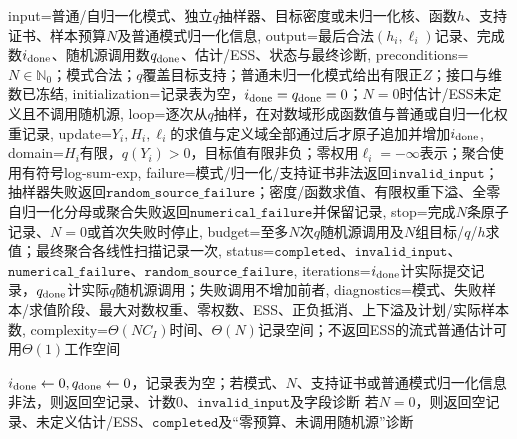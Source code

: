 \begin{AlgorithmContract}{
  input={普通/自归一化模式、独立$q$抽样器、目标密度或未归一化核、函数$h$、支持证书、样本预算$N$及普通模式归一化信息},
  output={最后合法$(h_i,\ell_i)$记录、完成数$i_{\rm done}$、随机源调用数$q_{\rm done}$、估计/ESS、状态与最终诊断},
  preconditions={$N\in\mathbb N_0$；模式合法；$q$覆盖目标支持；普通未归一化模式给出有限正$Z$；接口与维数已冻结},
  initialization={记录表为空，$i_{\rm done}=q_{\rm done}=0$；$N=0$时估计/ESS未定义且不调用随机源},
  loop={逐次从$q$抽样，在对数域形成函数值与普通或自归一化权重记录},
  update={$Y_i,H_i,\ell_i$的求值与定义域全部通过后才原子追加并增加$i_{\rm done}$},
  domain={$H_i$有限，$q(Y_i)>0$，目标值有限非负；零权用$\ell_i=-\infty$表示；聚合使用有符号log-sum-exp},
  failure={模式/归一化/支持证书非法返回$\mathtt{invalid\_input}$；抽样器失败返回$\mathtt{random\_source\_failure}$；密度/函数求值、有限权重下溢、全零自归一化分母或聚合失败返回$\mathtt{numerical\_failure}$并保留记录},
  stop={完成$N$条原子记录、$N=0$或首次失败时停止},
  budget={至多$N$次$q$随机源调用及$N$组目标/$q$/$h$求值；最终聚合各线性扫描记录一次},
  status={$\mathtt{completed}$、$\mathtt{invalid\_input}$、$\mathtt{numerical\_failure}$、$\mathtt{random\_source\_failure}$},
  iterations={$i_{\rm done}$计实际提交记录，$q_{\rm done}$计实际$q$随机源调用；失败调用不增加前者},
  diagnostics={模式、失败样本/求值阶段、最大对数权重、零权数、ESS、正负抵消、上下溢及计划/实际样本数},
  complexity={$\Theta(NC_I)$时间、$\Theta(N)$记录空间；不返回ESS的流式普通估计可用$\Theta(1)$工作空间}
}
\begin{algorithm}[t]
\caption{对数缩放的普通或自归一化重要性估计}\label{alg:V5-C02-importance-estimation}
$i_{\rm done}\leftarrow0,q_{\rm done}\leftarrow0$，记录表为空；若模式、$N$、支持证书或普通模式归一化信息非法，则返回空记录、计数$0$、$\mathtt{invalid\_input}$及字段诊断\;
若$N=0$，则返回空记录、未定义估计/ESS、$\mathtt{completed}$及“零预算、未调用随机源”诊断\;
\end{algorithm}
\end{AlgorithmContract}
